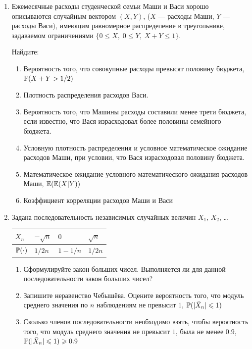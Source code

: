 \documentclass[12pt, a4paper]{article}\usepackage[]{graphicx}\usepackage[]{color}
\begin{document}
\begin{enumerate}
\item Ежемесячные расходы студенческой семьи Маши и Васи хорошо описываются случайным
вектором $(X,Y)$, ($X$ — расходы Маши, $Y$ — расходы Васи), имеющим равномерное
распределение в треугольнике, задаваемом ограничениями $\{0 \leq X, \; 0\leq Y, \; X+Y \leq 1 \}$.

Найдите:

\begin{enumerate}
\item Вероятность того, что совокупные расходы превысят половину бюджета, $\P(X+Y>1/2)$
\item Плотность распределения расходов Васи.
\item Вероятность того, что Машины расходы составили менее трети бюджета, если
известно, что Вася израсходовал более половины семейного бюджета.
\item Условную плотность распределения и условное математическое ожидание расходов Маши, при условии, что Вася израсходовал половину бюджета.
\item Математическое ожидание условного математического ожидания расходов Маши, $\E(\E(X|Y))$
\item Коэффициент корреляции расходов Маши и Васи
\end{enumerate}

\item Задана последовательность независимых случайных величин $X_1$, $X_2$, \ldots

\begin{tabular}{llll}
\toprule
$X_n$ & $-\sqrt{n}$ & $0$ & $\sqrt{n}$ \\ \midrule
$\P(\cdot)$ & $1/2n$ & $1-1/n$ & $1/2n$ \\
\bottomrule
\end{tabular}

\begin{enumerate}
\item Сформулируйте закон больших чисел. Выполняется ли для данной последовательности
закон больших чисел?
\item Запишите неравенство Чебышёва. Оцените вероятность того, что модуль среднего
значения по $n$ наблюдениям не превысит $1$, $\P(|\bar X_n| \leq 1)$
\item Сколько членов последовательности необходимо взять, чтобы вероятность того, что
модуль среднего значения не превысит $1$, была не менее $0.9$, $\P(|\bar X_n| \leq 1)\geq 0.9$
\end{enumerate}


\end{enumerate}
\end{document}
